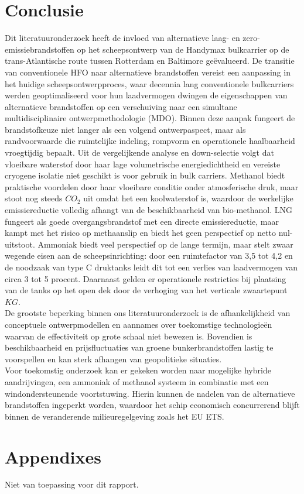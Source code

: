 \documentclass[a4paper]{IMDC2024}
\begin{document}
\section{Conclusie}
Dit literatuuronderzoek heeft de invloed van alternatieve laag- en zero-emissiebrandstoffen op het scheepsontwerp van de Handymax bulkcarrier op de trans-Atlantische route tussen Rotterdam en Baltimore geëvalueerd. De transitie van conventionele HFO naar alternatieve brandstoffen vereist een aanpassing in het huidige scheepsontwerpproces, waar decennia lang conventionele bulkcarriers werden geoptimaliseerd voor hun laadvermogen dwingen de eigenschappen van alternatieve brandstoffen op een verschuiving naar een simultane multidisciplinaire ontwerpmethodologie (MDO). Binnen deze aanpak fungeert de brandstofkeuze niet langer als een volgend ontwerpaspect, maar als randvoorwaarde die ruimtelijke indeling, rompvorm en operationele haalbaarheid vroegtijdig bepaalt. Uit de vergelijkende analyse en down-selectie volgt dat vloeibare waterstof door haar lage volumetrische energiedichtheid en vereiste cryogene isolatie niet geschikt is voor gebruik in bulk carriers. Methanol biedt praktische voordelen door haar vloeibare conditie onder atmosferische druk, maar stoot nog steeds $CO_2$ uit omdat het een koolwaterstof is, waardoor de werkelijke emissiereductie volledig afhangt van de beschikbaarheid van bio-methanol. LNG fungeert als goede overgangsbrandstof met een directe emissiereductie, maar kampt met het risico op methaanslip en biedt het geen perspectief op netto nul-uitstoot. Ammoniak biedt veel perspectief op de lange termijn, maar stelt zwaar wegende eisen aan de scheepsinrichting: door een ruimtefactor van 3,5 tot 4,2 en de noodzaak van type C druktanks leidt dit tot een verlies van laadvermogen van circa 3 tot 5 procent. Daarnaast gelden er operationele restricties bij plaatsing van de tanks op het open dek door de verhoging van het verticale zwaartepunt $KG$. \\
De grootste beperking binnen ons literatuuronderzoek is de afhankelijkheid van conceptuele ontwerpmodellen en aannames over toekomstige technologieën waarvan de effectiviteit op grote schaal niet bewezen is. Bovendien is beschikbaarheid en prijsfluctuaties van groene bunkerbrandstoffen lastig te voorspellen en kan sterk afhangen van geopolitieke situaties. \\
Voor toekomstig onderzoek kan er gekeken worden naar mogelijke hybride aandrijvingen, een ammoniak of methanol systeem in combinatie met een windondersteunende voortstuwing. Hierin kunnen de nadelen van de alternatieve brandstoffen ingeperkt worden, waardoor het schip economisch concurrerend blijft binnen de veranderende milieuregelgeving zoals het EU ETS.



\section{Appendixes}

Niet van toepassing voor dit rapport.

\end{document}
